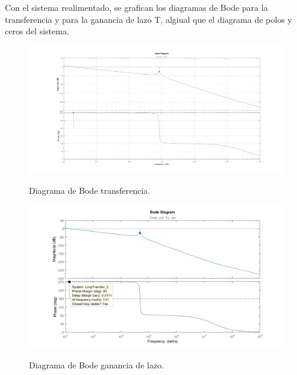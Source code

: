 Con el sistema realimentado, se grafican los diagramas de Bode para la transferencia y para la ganancia de lazo T, algiual que el diagrama de polos y ceros del sistema.
\begin{figure}[H]
	\centering
	\includegraphics[width=0.9\linewidth]{ImagenesParteIII/Bode.png}
	\label{fig:bode}
	\caption{Diagrama de Bode transferencia.}
\end{figure}
\begin{figure}[H]
	\centering
	\includegraphics[width=0.9\linewidth]{ImagenesParteIII/BodeT.png}
	\label{fig:bodeT}
	\caption{Diagrama de Bode ganancia de lazo.}
\end{figure}


